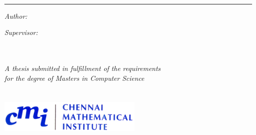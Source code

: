 \begin{titlepage}
  \doublespacing
  \large
  \hfill
  \vfill
  \vspace*{0.5cm}
  \begin{center}
    \doublespacing
    \textcolor{Maroon}{\huge\textbf{\myTitle}}\\
  \end{center}
  \vspace{1.25cm}
  \hrule
  \vspace{1.5cm}
  \onehalfspacing
  \begin{center}
    \begin{minipage}[t]{0.5\textwidth}
      \begin{flushleft}
        \emph{Author:}\\
        \href{\myWebsite}{{\myFirstName} \textsc{\myLastName}}
      \end{flushleft}
    \end{minipage}
    \begin{minipage}[t]{0.4\textwidth}
      \begin{flushright}
        \emph{Supervisor:}\\
        \href{\myProfWebsite}{{\myProfTitle} {\myProfFirstName} \textsc{\myProfLastName}}\\
      \end{flushright}
    \end{minipage}\\[2.5cm]

    \textit{A thesis submitted in fulfillment of the requirements}\\
    \textit{for the degree of Masters in Computer Science}\\[1cm]

    \myDepartment\\
    \href{\myUniWebsite}{\textsc{\myUni}}\\[1cm]

    \includegraphics[width=7cm]{figures/cmi}\\

    \hfill
    \vfill

    {\mySubmissionMonth} {\mySubmissionYear}
  \end{center}
\end{titlepage}
